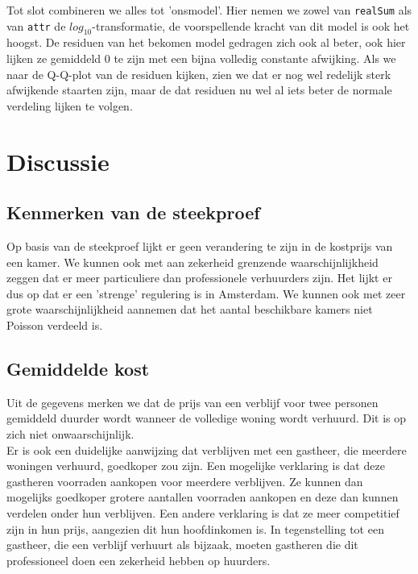 \documentclass[a4paper]{kulakarticle}
\begin{document}
	Tot slot combineren we alles tot 'onsmodel'. Hier nemen we zowel van  \verb*|realSum| als van  \verb*|attr| de $log_{10}$-transformatie, de voorspellende kracht van dit model is ook het hoogst. De residuen van het bekomen model gedragen zich ook al beter, ook hier lijken ze gemiddeld $0$ te zijn met een bijna volledig constante afwijking. Als we naar de Q-Q-plot van de residuen kijken, zien we dat er nog wel redelijk sterk afwijkende staarten zijn, maar de dat residuen nu wel al iets beter de normale verdeling lijken te volgen.  
	
	\section{Discussie}
	
	\subsection{Kenmerken van de steekproef}
	Op basis van de steekproef lijkt er geen verandering te zijn in de kostprijs van een kamer. We kunnen ook met aan zekerheid grenzende waarschijnlijkheid zeggen dat er meer particuliere dan professionele verhuurders zijn. Het lijkt er dus op dat er een 'strenge' regulering is in Amsterdam. We kunnen ook met zeer grote waarschijnlijkheid aannemen dat het aantal beschikbare kamers niet Poisson verdeeld is.
	
	\subsection{Gemiddelde kost}
	
	Uit de gegevens merken we dat de prijs van een verblijf voor twee personen gemiddeld duurder wordt wanneer de volledige woning wordt verhuurd. Dit is op zich niet onwaarschijnlijk.\\
	
	Er is ook een duidelijke aanwijzing dat verblijven met een gastheer, die meerdere woningen verhuurd, goedkoper zou zijn. Een mogelijke verklaring is dat deze gastheren voorraden aankopen voor meerdere verblijven. Ze kunnen dan mogelijks goedkoper grotere aantallen voorraden aankopen en deze dan kunnen verdelen onder hun verblijven. Een andere verklaring is dat ze meer competitief zijn in hun prijs, aangezien dit hun hoofdinkomen is. In tegenstelling tot een gastheer, die een verblijf verhuurt als bijzaak, moeten gastheren die dit professioneel doen een zekerheid hebben op huurders.\\
	
\end{document}
